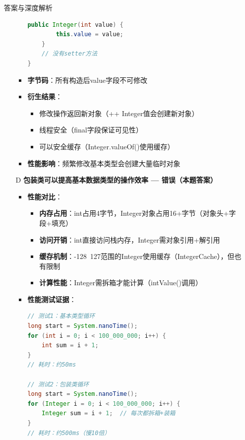 \documentclass[12pt, a4paper]{ctexart}
\begin{document}
\begin{enumerate}[label=\textbf{\arabic*.}]
\begin{bluebox}{答案与深度解析}
\begin{itemize}[leftmargin=*, nosep, label={}]
\begin{itemize}[label={}, leftmargin=*, nosep]
\begin{lstlisting}[language=Java]
    public Integer(int value) {
        this.value = value;
    }
    // 没有setter方法
}
				            \end{lstlisting}
				            \item \textbf{字节码}：所有构造后value字段不可修改
				            \item \textbf{衍生结果}：
				                  \begin{itemize}[label={}, nosep]
					                  \item 修改操作返回新对象（++ Integer值会创建新对象）
					                  \item 线程安全（final字段保证可见性）
					                  \item 可以安全缓存（Integer.valueOf()使用缓存）
				                  \end{itemize}
				            \item \textbf{性能影响}：频繁修改基本类型会创建大量临时对象
			            \end{itemize}

			      \item[D] \textbf{包装类可以提高基本数据类型的操作效率 — 错误（本题答案）}
			            \begin{itemize}[label={}, leftmargin=*, nosep]
				            \item \textbf{性能对比}：
				                  \begin{itemize}[label={}, nosep]
					                  \item \textbf{内存占用}：int占用4字节，Integer对象占用16+字节（对象头+字段+填充）
					                  \item \textbf{访问开销}：int直接访问栈内存，Integer需对象引用+解引用
					                  \item \textbf{缓存机制}：-128~127范围的Integer使用缓存（IntegerCache），但也有限制
					                  \item \textbf{计算性能}：Integer需拆箱才能计算（intValue()调用）
				                  \end{itemize}
				            \item \textbf{性能测试证据}：
				                  \begin{lstlisting}[language=Java]
// 测试1：基本类型循环
long start = System.nanoTime();
for (int i = 0; i < 100_000_000; i++) {
    int sum = i + 1;
}
// 耗时：约50ms

// 测试2：包装类循环
long start = System.nanoTime();
for (Integer i = 0; i < 100_000_000; i++) {
    Integer sum = i + 1;  // 每次都拆箱+装箱
}
// 耗时：约500ms（慢10倍）


\end{lstlisting}
\end{itemize}
\end{itemize}
\end{bluebox}
\end{enumerate}
\end{document}
